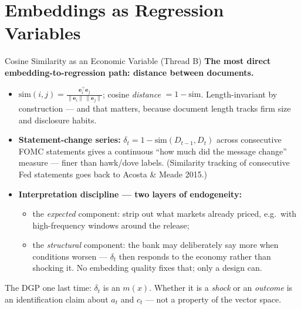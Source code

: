 \section{Embeddings as Regression Variables}

\begin{frame}{Cosine Similarity as an Economic Variable (Thread B)}
\textbf{The most direct embedding-to-regression path: distance between documents.}
\begin{itemize}
\item $\mathrm{sim}(i,j) = \frac{\mathbf{e}_i^\top \mathbf{e}_j}{\|\mathbf{e}_i\|\,\|\mathbf{e}_j\|}$; cosine \emph{distance} $= 1-\mathrm{sim}$. Length-invariant by construction --- and that matters, because document length tracks firm size and disclosure habits.
\item \textbf{Statement-change series:} $\delta_t = 1 - \mathrm{sim}(D_{t-1}, D_t)$ across consecutive FOMC statements gives a continuous ``how much did the message change'' measure --- finer than hawk/dove labels. (Similarity tracking of consecutive Fed statements goes back to Acosta \& Meade 2015.)
\item \textbf{Interpretation discipline --- two layers of endogeneity:}
\begin{itemize}
    \item the \emph{expected} component: strip out what markets already priced, e.g.\ with high-frequency windows around the release;
    \item the \emph{structural} component: the bank may deliberately say more when conditions worsen --- $\delta_t$ then responds to the economy rather than shocking it. No embedding quality fixes that; only a design can.
\end{itemize}
\end{itemize}
\smallskip
\begin{takeawaybox}
The DGP one last time: $\delta_t$ is an $m(x)$. Whether it is a \emph{shock} or an \emph{outcome} is an identification claim about $a_t$ and $c_t$ --- not a property of the vector space.
\end{takeawaybox}
\end{frame}

